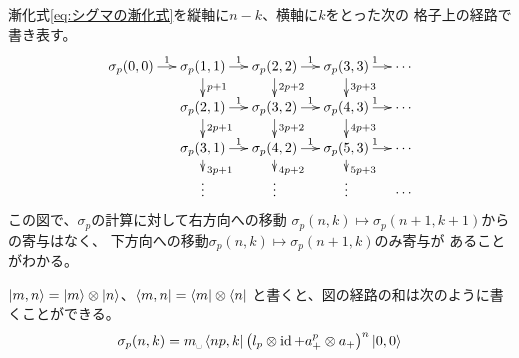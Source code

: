 	漸化式\eqref{eq:シグマの漸化式}を縦軸に$n-k$、横軸に$k$をとった次の
	格子上の経路で書き表す。
	\begin{equation*}\xymatrix@R=3ex@C=3ex{
		\sigma_p(0,0)\ar[r]^{1} & \sigma_p(1,1)\ar[r]^{1}\ar[d]^{p+1}
			& \sigma_p(2,2)\ar[r]^{1}\ar[d]^{2p+2} 
			& \sigma_p(3,3)\ar[r]^{1}\ar[d]^{3p+3} & \cdots \\
		& \sigma_p(2,1)\ar[r]^{1}\ar[d]^{2p+1} 
			& \sigma_p(3,2)\ar[r]^{1}\ar[d]^{3p+2} 
			& \sigma_p(4,3)\ar[r]^{1}\ar[d]^{4p+3} & \cdots \\
		& \sigma_p(3,1)\ar[r]^{1}\ar[d]^{3p+1} 
			& \sigma_p(4,2)\ar[r]^{1}\ar[d]^{4p+2} 
			& \sigma_p(5,3)\ar[r]^{1}\ar[d]^{5p+3} & \cdots \\
		& \vdots & \vdots & \vdots & \cdots \\
	}\end{equation*}
	この図で、$\sigma_p$の計算に対して右方向への移動
	$\sigma_p(n,k)\mapsto\sigma_p(n+1,k+1)$からの寄与はなく、
	下方向への移動$\sigma_p(n,k)\mapsto\sigma_p(n+1,k)$のみ寄与が
	あることがわかる。

	\begin{todo}[ここまで]\label{todo:ここまで} %
		$\mathinner{|{m,n}\rangle}=\mathinner{|{m}\rangle}\otimes\mathinner{|{n}\rangle}$、$\mathinner{\langle{m,n}|}=\mathinner{\langle{m}|}\otimes\mathinner{\langle{n}|}$
		と書くと、図の経路の和は次のように書くことができる。
		\begin{equation*}\begin{split} %
			\sigma_p(n,k) = m_\myspace\bra{np,k} 
			\bigl(l_p\otimes\myid + a_+^p\otimes a_+\bigr)^n \ket{0,0}
		\end{split}\end{equation*} %
	\end{todo} %
	

